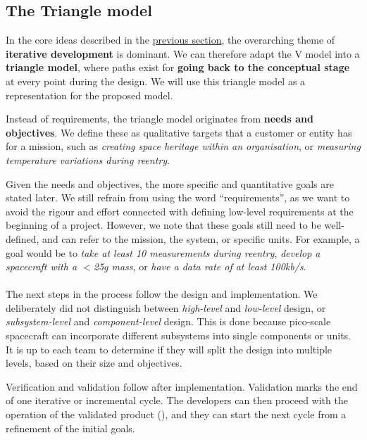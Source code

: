 \documentclass[]{iac}
\begin{document}
\subsection{The Triangle model}
\label{sec:the_triangle_model}

In the core ideas described in the \hyperref[sec:agile_principles]{previous section}, the overarching theme of \textbf{iterative development} is dominant. %
We can therefore adapt the V model into a \textbf{triangle model}, where paths exist for \textbf{going back to the conceptual stage} at every point during the design. We will use this triangle model as a representation \autocite{gerrike_what_2017} for the proposed model.

Instead of requirements, the triangle model originates from \textbf{needs and objectives}. We define these as qualitative targets that a customer or entity has for a mission, such as \emph{creating space heritage within an organisation}, or \emph{measuring temperature variations during reentry}.

Given the needs and objectives, the more specific and quantitative goals are stated later. We still refrain from using the word ``requirements'', as we want to avoid the rigour and effort connected with defining low-level requirements at the beginning of a project. However, we note that these goals still need to be well-defined, and can refer to the mission, the system, or specific units. For example, a goal would be to \emph{take at least 10 measurements during reentry}, \emph{develop a spacecraft with a \(<\)25\si{\gram} mass}, or \emph{have a data rate of at least 100\si{kb/s}}.

\paragraph{}

The next steps in the process follow the design and implementation. We deliberately did not distinguish between \emph{high-level} and \emph{low-level} design, or \emph{subsystem-level} and \emph{component-level} design. This is done because pico-scale spacecraft can incorporate different subsystems into single components or units. It is up to each team to determine if they will split the design into multiple levels, based on their size and objectives.

Verification and validation follow after implementation. Validation marks the end of one iterative or incremental cycle. The developers can then proceed with the operation of the validated product (), and they can start the next cycle from a refinement of the initial goals.
\end{document}
